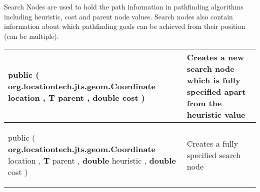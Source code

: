  {\scriptsize Search Nodes are used to hold the path information in pathfinding algorithms including heuristic, cost and parent node values. Search nodes also contain information about which\newline%
 pathfinding goals can be achieved from their position (can be multiple).
 
\vspace*{-5pt} 
\begin{tabularx}{\linewidth}{X|m{}}
\label{tab:SearchNode}
\begin{raggedleft}public  \textbf{\hyperref[tab:SearchNode]{\color{blue}{SearchNode}} }(\newline \hfill 
\hspace*{ 5pt} \textbf{org.locationtech.jts.geom.Coordinate} location , \newline
 \hspace*{ 5pt} \textbf{T} parent , \newline
 \hspace*{ 5pt} \textbf{double} cost  )
\end{raggedleft} &
 Creates a new  search node which is fully specified apart from\newline%
 the heuristic value\\ \hline 
\begin{raggedleft}public  \textbf{\hyperref[tab:SearchNode]{\color{blue}{SearchNode}} }(\newline \hfill 
\hspace*{ 5pt} \textbf{org.locationtech.jts.geom.Coordinate} location , \newline
 \hspace*{ 5pt} \textbf{T} parent , \newline
 \hspace*{ 5pt} \textbf{double} heuristic , \newline
 \hspace*{ 5pt} \textbf{double} cost  )
\end{raggedleft} &
 Creates a fully specified search node\\\end{tabularx}
}
